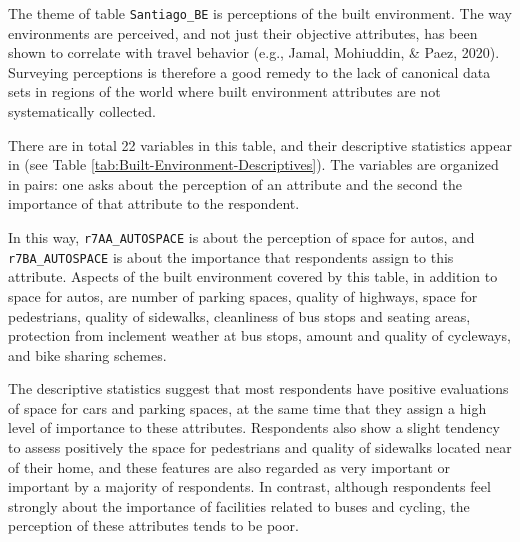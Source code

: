 \documentclass[
11pt, %
oneside, %
english, %
singlespacing, %
]{macthesis} %
\begin{document}
The theme of table \texttt{Santiago\_BE} is perceptions of the built environment. The way environments are perceived, and not just their objective attributes, has been shown to correlate with travel behavior (e.g., Jamal, Mohiuddin, \& Paez, 2020). Surveying perceptions is therefore a good remedy to the lack of canonical data sets in regions of the world where built environment attributes are not systematically collected.

There are in total 22 variables in this table, and their descriptive statistics appear in (see Table \ref{tab:Built-Environment-Descriptives}). The variables are organized in pairs: one asks about the perception of an attribute and the second the importance of that attribute to the respondent.

In this way, \texttt{r7AA\_AUTOSPACE} is about the perception of space for autos, and \texttt{r7BA\_AUTOSPACE} is about the importance that respondents assign to this attribute. Aspects of the built environment covered by this table, in addition to space for autos, are number of parking spaces, quality of highways, space for pedestrians, quality of sidewalks, cleanliness of bus stops and seating areas, protection from inclement weather at bus stops, amount and quality of cycleways, and bike sharing schemes.

The descriptive statistics suggest that most respondents have positive evaluations of space for cars and parking spaces, at the same time that they assign a high level of importance to these attributes. Respondents also show a slight tendency to assess positively the space for pedestrians and quality of sidewalks located near of their home, and these features are also regarded as very important or important by a majority of respondents. In contrast, although respondents feel strongly about the importance of facilities related to buses and cycling, the perception of these attributes tends to be poor.
\end{document}
